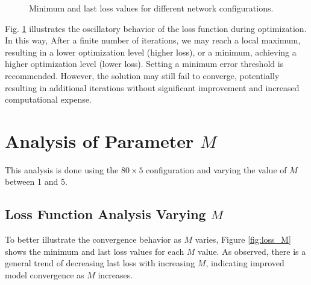 \begin{figure}[h!]
    \centering
    \caption{Minimum and last loss values for different network configurations.}
    \label{fig:loss_plot}
\end{figure}

Fig. \ref{fig:loss_plot} illustrates the oscillatory behavior of the loss function during optimization. In this way, After a finite number of iterations, we may reach a local maximum, resulting in a lower optimization level (higher loss), or a minimum, achieving a higher optimization level (lower loss). Setting a minimum error threshold is recommended. However, the solution may still fail to converge, potentially resulting in additional iterations without significant improvement and increased computational expense. 



\section{Analysis of Parameter \( M \)}
This analysis is done using the $80 \times 5$ configuration and varying the value of \( M \) between 1 and 5.


\subsection{Loss Function Analysis Varying \( M \)}

To better illustrate the convergence behavior as \( M \) varies, Figure \ref{fig:loss_M} shows the minimum and last loss values for each \( M \) value. As observed, there is a general trend of decreasing last loss with increasing \( M \), indicating improved model convergence as \( M \) increases.

